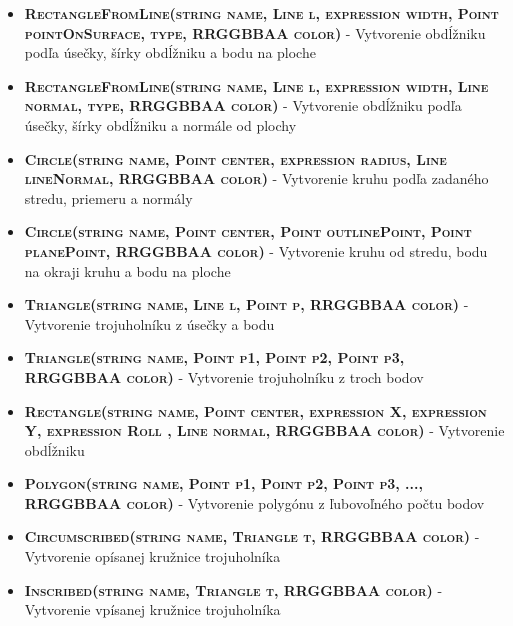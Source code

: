 \begin{itemize}

\item \textsc{\textbf{RectangleFromLine(string name, Line l, expression width, Point pointOnSurface, type, RRGGBBAA color)}} - Vytvorenie obdĺžniku podľa úsečky, šírky obdĺžniku a bodu na ploche  %
	
\item \textsc{\textbf{RectangleFromLine(string name, Line l, expression width, Line normal, type, RRGGBBAA color)}} - Vytvorenie obdĺžniku podľa úsečky, šírky obdĺžniku a normále od plochy %

\item \textsc{\textbf{Circle(string name, Point center, expression radius, Line lineNormal, RRGGBBAA color)}} - Vytvorenie kruhu podľa zadaného stredu, priemeru a normály%
	
\item \textsc{\textbf{Circle(string name, Point center, Point outlinePoint, Point planePoint, RRGGBBAA color)}} - Vytvorenie kruhu od stredu, bodu na okraji kruhu a bodu na ploche %

\item \textsc{\textbf{Triangle(string name, Line l, Point p, RRGGBBAA color)}} - Vytvorenie trojuholníku z úsečky a bodu%
	
\item \textsc{\textbf{Triangle(string name, Point p1, Point p2, Point p3, RRGGBBAA color)}} -  Vytvorenie trojuholníku z troch bodov%


\item \textsc{\textbf{Rectangle(string name, Point center, expression X, expression Y, expression Roll
    , Line normal, RRGGBBAA color)}} - Vytvorenie obdĺžniku%

\item \textsc{\textbf{Polygon(string name, Point p1, Point p2, Point p3, ..., RRGGBBAA color)}} - Vytvorenie polygónu z ľubovoľného počtu bodov%


\item \textsc{\textbf{Circumscribed(string name, Triangle t, RRGGBBAA color)}}  - Vytvorenie opísanej kružnice trojuholníka %
	
\item \textsc{\textbf{Inscribed(string name, Triangle t, RRGGBBAA color)}} - Vytvorenie vpísanej kružnice trojuholníka %
	
\end{itemize}
